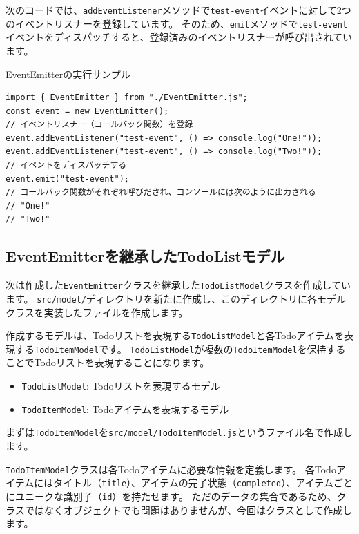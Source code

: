 次のコードでは、\texttt{addEventListener}メソッドで\texttt{test-event}イベントに対して2つのイベントリスナーを登録しています。
そのため、\texttt{emit}メソッドで\texttt{test-event}イベントをディスパッチすると、登録済みのイベントリスナーが呼び出されています。

\begin{listtitle}
EventEmitterの実行サンプル
\end{listtitle}
\begin{lstlisting}
import { EventEmitter } from "./EventEmitter.js";
const event = new EventEmitter();
// イベントリスナー（コールバック関数）を登録
event.addEventListener("test-event", () => console.log("One!"));
event.addEventListener("test-event", () => console.log("Two!"));
// イベントをディスパッチする
event.emit("test-event");
// コールバック関数がそれぞれ呼びだされ、コンソールには次のように出力される
// "One!"
// "Two!"
\end{lstlisting}
\listend

\hypertarget{event-emitter-todolist-model}{%
\subsection{EventEmitterを継承したTodoListモデル}\label{event-emitter-todolist-model}}

次は作成した\texttt{EventEmitter}クラスを継承した\texttt{TodoListModel}クラスを作成しています。
\texttt{src/model/}ディレクトリを新たに作成し、このディレクトリに各モデルクラスを実装したファイルを作成します。

作成するモデルは、Todoリストを表現する\texttt{TodoListModel}と各Todoアイテムを表現する\texttt{TodoItemModel}です。
\texttt{TodoListModel}が複数の\texttt{TodoItemModel}を保持することでTodoリストを表現することになります。

\begin{itemize}
\item
  \texttt{TodoListModel}: Todoリストを表現するモデル
\item
  \texttt{TodoItemModel}: Todoアイテムを表現するモデル
\end{itemize}

まずは\texttt{TodoItemModel}を\texttt{src/model/TodoItemModel.js}というファイル名で作成します。

\texttt{TodoItemModel}クラスは各Todoアイテムに必要な情報を定義します。
各Todoアイテムにはタイトル（\texttt{title}）、アイテムの完了状態（\texttt{completed}）、アイテムごとにユニークな識別子（\texttt{id}）を持たせます。
ただのデータの集合であるため、クラスではなくオブジェクトでも問題はありませんが、今回はクラスとして作成します。

